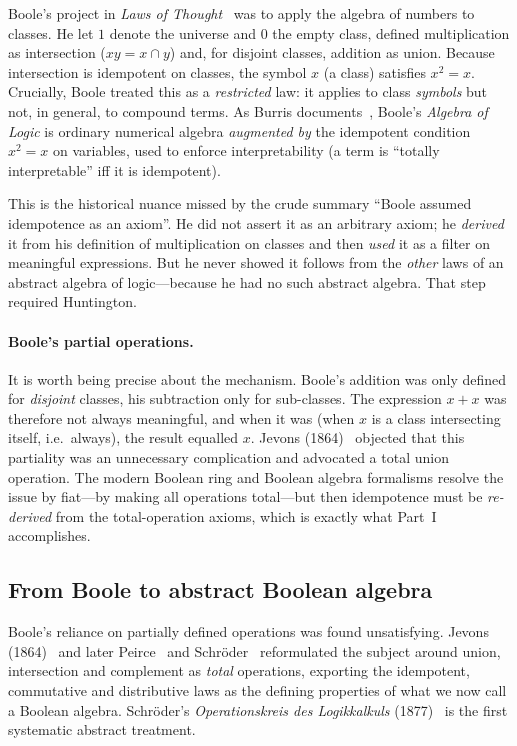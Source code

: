\documentclass[11pt]{article}
\theoremstyle{definition}
\begin{document}
Boole's project in \emph{Laws of Thought}~\cite{boole1854} was to apply the
algebra of numbers to classes. He let $1$ denote the universe and $0$ the
empty class, defined multiplication as intersection ($xy = x\cap y$) and, for
disjoint classes, addition as union. Because intersection is idempotent on
classes, the symbol $x$ (a class) satisfies $x^2=x$. Crucially, Boole treated
this as a \emph{restricted} law: it applies to class \emph{symbols} but not, in
general, to compound terms. As Burris documents~\cite{burrisAoC}, Boole's
\emph{Algebra of Logic} is ordinary numerical algebra \emph{augmented by} the
idempotent condition $x^2=x$ on variables, used to enforce interpretability (a
term is ``totally interpretable'' iff it is idempotent).

This is the historical nuance missed by the crude summary ``Boole assumed
idempotence as an axiom''. He did not assert it as an arbitrary axiom; he
\emph{derived} it from his definition of multiplication on classes and then
\emph{used} it as a filter on meaningful expressions. But he never showed it
follows from the \emph{other} laws of an abstract algebra of logic---because he
had no such abstract algebra. That step required Huntington.

\paragraph{Boole's partial operations.}
It is worth being precise about the mechanism. Boole's addition was only
defined for \emph{disjoint} classes, his subtraction only for sub-classes. The
expression $x+x$ was therefore not always meaningful, and when it was (when
$x$ is a class intersecting itself, i.e.\ always), the result equalled $x$.
Jevons (1864)~\cite{jevons1864} objected that this partiality was an
unnecessary complication and advocated a total union operation. The modern
Boolean ring and Boolean algebra formalisms resolve the issue by fiat---by
making all operations total---but then idempotence must be \emph{re-derived}
from the total-operation axioms, which is exactly what Part~I accomplishes.

\subsection{From Boole to abstract Boolean algebra}
\label{sec:hist-jevons}

Boole's reliance on partially defined operations was found unsatisfying. Jevons
(1864)~\cite{jevons1864} and later Peirce~\cite{peirce1885} and
Schröder~\cite{schroder1877} reformulated the subject around union,
intersection and complement as \emph{total} operations, exporting the
idempotent, commutative and distributive laws as the defining properties of
what we now call a Boolean algebra. Schröder's \emph{Operationskreis des
Logikkalkuls} (1877)~\cite{schroder1877} is the first systematic abstract
treatment.
\end{document}
